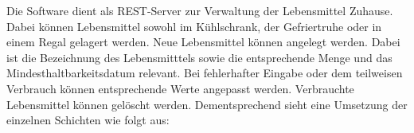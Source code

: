 
Die Software dient als \ac{REST}-Server zur Verwaltung der Lebensmittel Zuhause.
Dabei können Lebensmittel sowohl im Kühlschrank, der Gefriertruhe oder in einem Regal gelagert werden.
Neue Lebensmittel können angelegt werden.
Dabei ist die Bezeichnung des Lebensmitttels sowie die entsprechende Menge und das Mindesthaltbarkeitsdatum relevant.
Bei fehlerhafter Eingabe oder dem teilweisen Verbrauch können entsprechende Werte angepasst werden.
Verbrauchte Lebensmittel können gelöscht werden.
Dementsprechend sieht eine Umsetzung der einzelnen Schichten wie folgt aus:

